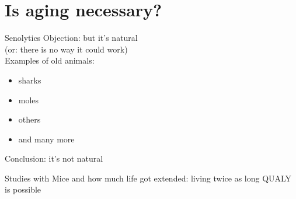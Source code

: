 \section{Is aging necessary?}


\begin{frame}[c]{Senolytics}
    Objection: but it's natural \\
    (or: there is no way it could work) \\
    Examples of old animals: \\
    
    \begin{itemize}[<+(1)->]
        \item sharks
        \item moles
        \item others
        \item and many more
    \end{itemize}
    Conclusion: it's not natural
\end{frame}



\begin{frame}[c]{Studies with Mice}
    and how much life got extended: living twice as long QUALY is possible
\end{frame}
